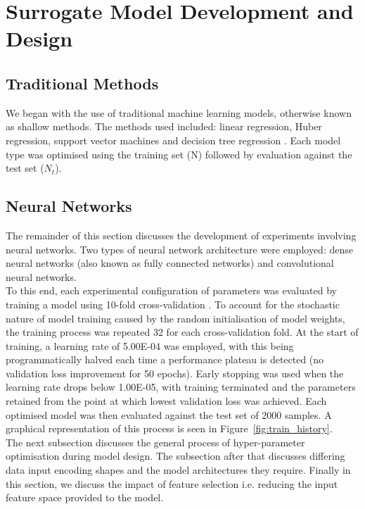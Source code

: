 \section{Surrogate Model Development and Design} \label{method}

\subsection{Traditional Methods} \label{traditional}

We began with the use of traditional machine learning models, otherwise known as shallow methods. The methods used included: linear regression, Huber regression, support vector machines \cite{smola2004tutorial} and decision tree regression \cite{navada2011overview}. Each model type was optimised using the training set (N) followed by evaluation against the test set ($N_t$). 

\subsection{Neural Networks}

The remainder of this section discusses the development of experiments involving neural networks. Two types of neural network architecture were employed: dense neural networks (also known as fully connected networks) and convolutional neural networks.
\\

\noindent
To this end, each experimental configuration of parameters was evaluated by training a model using 10-fold cross-validation \cite{refaeilzadeh2009cross}. To account for the stochastic nature of model training caused by the random initialisation of model weights, the training process was repeated 32 for each cross-validation fold. At the start of training, a learning rate of 5.00E-04 was employed, with this being programmatically halved each time a performance plateau is detected (no validation loss improvement for 50 epochs). Early stopping \cite{yao2007early} was used when the learning rate drops below  1.00E-05, with training terminated and the parameters retained from the point at which lowest validation loss was achieved. Each optimised model was then evaluated against the test set of 2000 samples. A graphical representation of this process is seen in Figure~\ref{fig:train_history}. 
\\

\noindent
The next subsection discusses the general process of hyper-parameter optimisation during model design. The subsection after that discusses differing data input encoding shapes and the model architectures they require. Finally in this section, we discuss the impact of feature selection i.e. reducing the input feature space provided to the model.

